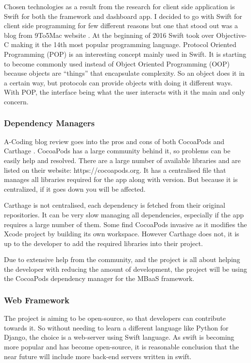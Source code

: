 Chosen technologies as a result from the research for client side application is Swift for both the framework and dashboard app. I decided to go with Swift for client side programming for few different reasons but one that stood out was a blog from 9To5Mac website \cite{webserver}. At the beginning of 2016 Swift took over Objective-C making it the 14th most popular programming language. Protocol Oriented Programming (POP) is an interesting concept mainly used in Swift. It is starting to become commonly used instead of Object Oriented Programming (OOP) because objects are “things” that encapsulate complexity. So an object does it in a certain way, but protocols can provide objects with doing it different ways. With POP, the interface being what the user interacts with it the main and only concern.

\subsubsection{Dependency Managers}

A-Coding blog review goes into the pros and cons of both CocoaPods and Carthage \cite{acodingwebsite}. CocoaPods has a large community behind it, so problems can be easily help and resolved. There are a large number of available libraries and are listed on their website: https://cocoapods.org. It has a centralised file that manages all libraries required for the app along with version. But because it is centralized, if it goes down you will be affected.

Carthage is not centralised, each dependency is fetched from their original repositories. It can be very slow managing all dependencies, especially if the app requires a large number of them. Some find CocoaPods invasive as it modifies the Xcode project by building its own workspace. However Carthage does not, it is up to the developer to add the required libraries into their project.

Due to extensive help from the community, and the project is all about helping the developer with reducing the amount of development, the project will be using the CocoaPods dependency manager for the MBaaS framework.


\subsubsection{Web Framework}

The project is aiming to be open-source, so that developers can contribute towards it. So without needing to learn a different language like Python for Django, the choice is a web-server using Swift language. As swift is becoming more popular and has become open-source, it is reasonable conclusion that the near future will include more back-end servers written in swift.

